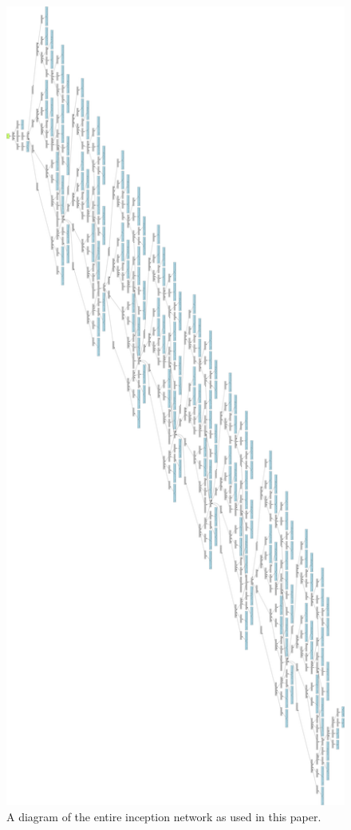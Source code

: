 \begin{figure}[htb]
    \centering
    \includegraphics[width=\paperwidth, height=\textheight, keepaspectratio]{images/inceptnet.png}
    \caption{A diagram of the entire inception network as used in this paper.}
    \label{diagram:inceptnet}
\end{figure}


